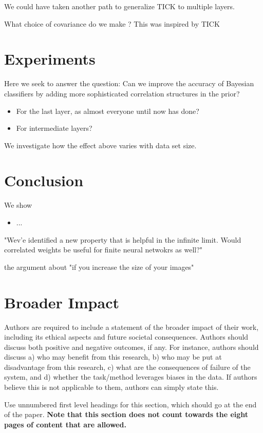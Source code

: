 \documentclass{article}
\begin{document}
We could have taken another path to generalize TICK to multiple layers.

What choice of covariance do we make ?
This was inspired by TICK

\section{Experiments}
Here we seek to answer the question:
 Can we improve the accuracy of Bayesian classifiers by adding more sophisticated correlation structures in the prior?
\begin{itemize}
    \item For the last layer, as almost everyone until now has done?
    \item For intermediate layers?
\end{itemize}

We investigate how the effect above varies with data set size.



\section{Conclusion}
We show
\begin{itemize}
    \item ...
\end{itemize}

"Wev'e identified a new property that is helpful in the infinite limit. Would correlated weights be useful for finite neural netwokrs as well?"

the argument about "if you increase the size of your images" 

\section*{Broader Impact}

Authors are required to include a statement of the broader impact of their work, including its ethical aspects and future societal consequences. 
Authors should discuss both positive and negative outcomes, if any. For instance, authors should discuss a) 
who may benefit from this research, b) who may be put at disadvantage from this research, c) what are the consequences of failure of the system, and d) whether the task/method leverages
biases in the data. If authors believe this is not applicable to them, authors can simply state this.

Use unnumbered first level headings for this section, which should go at the end of the paper. {\bf Note that this section does not count towards the eight pages of content that are allowed.}
\end{document}
